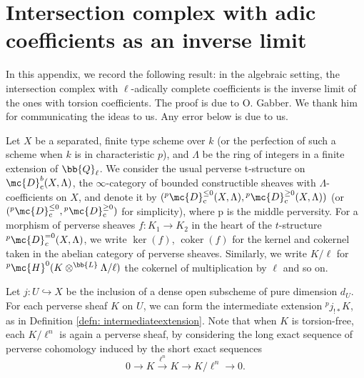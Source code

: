 \section{Intersection complex with adic coefficients as an inverse limit}
In this appendix, we record the following result: in the algebraic setting, the intersection complex with $\ell$-adically complete coefficients is the inverse limit of the ones with torsion coefficients. The proof is due to O. Gabber. We thank him for communicating the ideas to us. Any error below is due to us.

Let $X$ be a separated, finite type scheme over $k$ (or the perfection of such a scheme when $k$ is in characteristic $p$), and $\Lambda$ be the ring of integers in a finite extension of $\bb{Q}_\ell$. We consider the usual perverse t-structure on $\mc{D}^b_{\mathrm{c}}(X, \Lambda)$, the $\infty$-category of bounded constructible sheaves with $\Lambda$-coefficients on $X$, and denote it by $(\phantom{}^{p}\mc{D}_{\mathrm{c}}^{\leq 0}(X,\Lambda), \phantom{}^{p}\mc{D}_{\mathrm{c}}^{\geq 0}(X,\Lambda))$ (or $(\phantom{}^{p}\mc{D}_{\mathrm{c}}^{\leq 0}, \phantom{}^{p}\mc{D}_{\mathrm{c}}^{\geq 0})$ for simplicity), where p is the middle perversity. For a morphism of perverse sheaves $f: K_1\to K_2$ in the heart of the $t$-structure ${}^p\mc{D}^{=0}_c(X,\Lambda)$, we write $\operatorname{ker}(f)$, $\operatorname{coker}(f)$ for the kernel and cokernel taken in the abelian category of perverse sheaves. Similarly, we write $K/\ell$ for ${}^p\mc{H}^0(K\otimes^{\bb{L}}\Lambda/\ell)$ the cokernel of multiplication by $\ell$ and so on.

Let $j: U\hookrightarrow X$ be the inclusion of a dense open subscheme of pure dimension $d_U$. For each perverse sheaf $K$ on $U$, we can form the intermediate extension ${}^pj_{!\ast}K$, as in Definition \ref{defn: intermediateextension}. Note that when $K$ is torsion-free, each $K/\ell^n$ is again a perverse sheaf, by considering the long exact sequence of perverse cohomology induced by the short exact sequences
\[0\to K\xrightarrow{\ell^n}K\to K/\ell^n\to 0.\]

